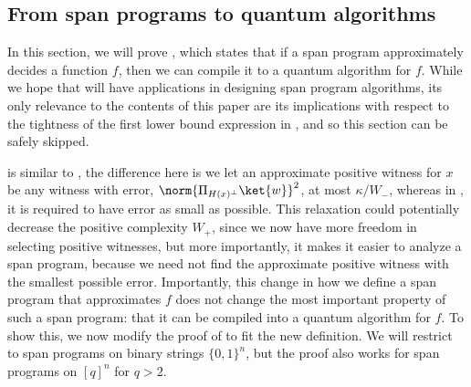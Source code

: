 \documentclass[11pt]{article}
\numberwithin{equation}{section}
\theoremstyle{definition}
\theoremstyle{plain}
\begin{document}
\subsection{From span programs to quantum algorithms}\label{sec:span-to-alg}

In this section, we will prove , which states that if a span program approximately decides a function $f$, then we can compile it to a quantum algorithm for $f$.
While we hope that  will have applications in designing span program algorithms, its only relevance to the contents of this paper are its implications with respect to the tightness of the first lower bound expression in , and so this section can be safely skipped. 

 is similar to \cite[Lemma 3.6]{IJ15}, the difference here is we let an approximate positive witness for $x$ be any witness with error, $\norm{\Pi_{H(x)^\bot}\ket{w}}^2$, at most $\kappa/W_-$, whereas in \cite{IJ15}, it is required to have error as small as possible. This relaxation could potentially decrease the positive complexity $\widehat{W}_+$, since we now have more freedom in selecting positive witnesses, but more importantly, it makes it easier to analyze a span program, because we %
need not  %
find the approximate positive witness with the smallest possible error. Importantly, this change in how we define a span program that approximates $f$ does not change the most important property of such a span program: that it can be compiled into a quantum algorithm for $f$. To show this, we now modify the proof of \cite[Lemma 3.6]{IJ15} to fit the new definition. We will restrict to span programs on binary strings $\{0,1\}^n$, but the proof also works for span programs on $[q]^n$ for $q>2$. 
\end{document}

